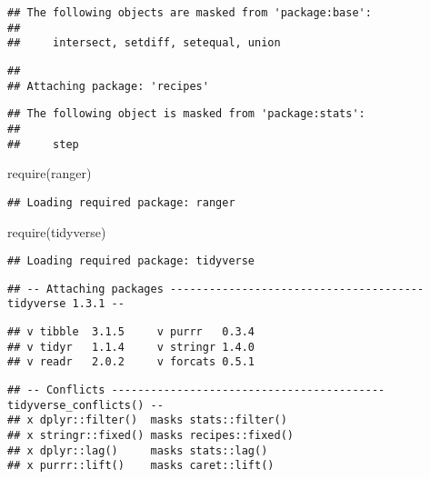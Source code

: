\documentclass[
]{article}
\newenvironment{Shaded}{\begin{snugshade}}{\end{snugshade}}
\newcommand{\FunctionTok}[1]{\textcolor[rgb]{0.00,0.00,0.00}{#1}}
\newcommand{\NormalTok}[1]{#1}
\begin{document}
\begin{verbatim}
## The following objects are masked from 'package:base':
## 
##     intersect, setdiff, setequal, union
\end{verbatim}

\begin{verbatim}
## 
## Attaching package: 'recipes'
\end{verbatim}

\begin{verbatim}
## The following object is masked from 'package:stats':
## 
##     step
\end{verbatim}

\begin{Shaded}
\begin{Highlighting}[]
  \FunctionTok{require}\NormalTok{(ranger)}
\end{Highlighting}
\end{Shaded}

\begin{verbatim}
## Loading required package: ranger
\end{verbatim}

\begin{Shaded}
\begin{Highlighting}[]
  \FunctionTok{require}\NormalTok{(tidyverse)}
\end{Highlighting}
\end{Shaded}

\begin{verbatim}
## Loading required package: tidyverse
\end{verbatim}

\begin{verbatim}
## -- Attaching packages --------------------------------------- tidyverse 1.3.1 --
\end{verbatim}

\begin{verbatim}
## v tibble  3.1.5     v purrr   0.3.4
## v tidyr   1.1.4     v stringr 1.4.0
## v readr   2.0.2     v forcats 0.5.1
\end{verbatim}

\begin{verbatim}
## -- Conflicts ------------------------------------------ tidyverse_conflicts() --
## x dplyr::filter()  masks stats::filter()
## x stringr::fixed() masks recipes::fixed()
## x dplyr::lag()     masks stats::lag()
## x purrr::lift()    masks caret::lift()
\end{verbatim}
\end{document}
